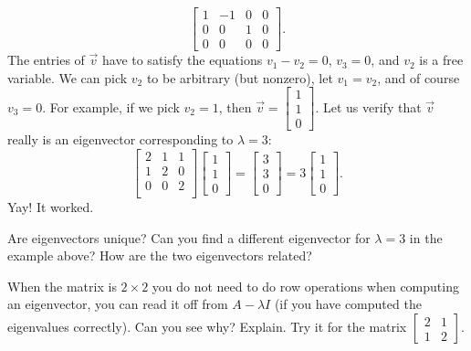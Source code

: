 \documentclass{ximera}
\begin{document}
\begin{exampleSol}
\begin{equation*}
\left[
    \begin{array}{ccc|c}
        1 & -1 & 0 & 0 \\
        0 & 0 & 1 & 0 \\
        0 & 0 & 0 & 0
    \end{array}
\right] .
\end{equation*}
The entries of $\vec{v}$ have to satisfy the equations $v_1 - v_2 = 0$, $v_3 = 0$, and $v_2$ is a free variable. We can pick $v_2$ to be arbitrary (but nonzero), let $v_1 = v_2$, and of course $v_3 = 0$. For example, if we pick $v_2 = 1$, then 
$\vec{v} = \left[ \begin{smallmatrix} 1 \\ 1 \\ 0 \end{smallmatrix} \right]$.
Let us verify that $\vec{v}$ really is an eigenvector corresponding to $\lambda = 3$:
\begin{equation*}
    \begin{bmatrix}
        2 & 1 & 1 \\
        1 & 2 & 0 \\
        0 & 0 & 2 \\
    \end{bmatrix}
    \begin{bmatrix}
        1 \\
        1 \\
        0
    \end{bmatrix}
    =
    \begin{bmatrix}
        3 \\
        3 \\
        0
    \end{bmatrix}
    = 3
    \begin{bmatrix}
        1 \\
        1 \\
        0
    \end{bmatrix} .
\end{equation*}
Yay!  It worked.
\end{exampleSol}

\begin{exercise}%
    Are eigenvectors unique?  Can you find a different eigenvector for $\lambda = 3$ in the example above?  How are the two eigenvectors related?
\end{exercise}

\begin{exercise}
    When the matrix is $2 \times 2$ you do not need to
    do row operations when computing an eigenvector, you can read it off from $A-\lambda I$ (if you have computed the eigenvalues correctly). Can you see why?  Explain.  Try it for the matrix 
    $\left[ \begin{smallmatrix} 2 & 1 \\ 1 & 2 \end{smallmatrix} \right]$.
\end{exercise}
\end{document}
